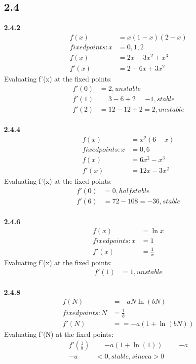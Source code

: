\documentclass[]{article}
\begin{document}
	\subsection*{2.4}
	\textbf{2.4.2}
	\begin{align*}
	f(x) &= x(1-x)(2-x) \\
	fixed points:x &= 0, 1, 2 \\
	f(x) &= 2x - 3x^2 + x^3 \\
	f'(x) &= 2-6x + 3x^2
	\end{align*}
	Evaluating f'(x) at the fixed points:
	\begin{align*}
	f'(0) &= 2, unstable \\ 
	f'(1) &= 3 - 6 + 2 = -1 , stable \\ 
	f'(2) &= 12 - 12 + 2 = 2, unstable
	\end{align*}
	\\
	\textbf{2.4.4}
	\begin{align*}
	f(x) &= x^2(6-x) \\
	fixed points:x &= 0, 6 \\
	f(x) &= 6x^2 - x^3\\
	f'(x) &=12x - 3x^2
	\end{align*}
	Evaluating f'(x) at the fixed points:
	\begin{align*}
	f'(0) &= 0, half stable \\ 
	f'(6) &= 72 - 108 = -36, stable 
	\end{align*}
	\\
	\textbf{2.4.6}
	\begin{align*}
	f(x) &= \ln x \\
	fixed points:x &= 1 \\
	f'(x) &= \frac{1}{x}
	\end{align*}
	Evaluating f'(x) at the fixed points:
	\begin{align*}
	f'(1) &= 1, unstable 
	\end{align*}
	\\
	\textbf{2.4.8}
	\begin{align*}
	f(N) &= -aN \ln (bN) \\
	fixed points:N &= \frac{1}{b} \\
	f'(N) &= = -a(1+\ln (bN))
	\end{align*}
	Evaluating f'(N) at the fixed points:
	\begin{align*}
	f'(\frac{1}{b}) &= -a(1+\ln (1)) &= -a\\
	-a &< 0, stable, since a > 0
	\end{align*}
	
\end{document}
